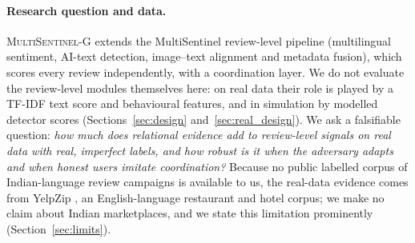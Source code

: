 \documentclass[pdflatex,sn-basic]{sn-jnl}
\theoremstyle{thmstyleone}
\theoremstyle{thmstylethree}
\newcommand{\MSG}{\textsc{MultiSentinel-G}}
\begin{document}
\paragraph{Research question and data.} \MSG{} extends the MultiSentinel review-level pipeline (multilingual sentiment, AI-text detection, image--text alignment and metadata fusion), which scores every review independently, with a coordination layer. We do not evaluate the review-level modules themselves here: on real data their role is played by a TF-IDF text score and behavioural features, and in simulation by modelled detector scores (Sections~\ref{sec:design} and~\ref{sec:real_design}). We ask a falsifiable question: \emph{how much does relational evidence add to review-level signals on real data with real, imperfect labels, and how robust is it when the adversary adapts and when honest users imitate coordination?} Because no public labelled corpus of Indian-language review campaigns is available to us, the real-data evidence comes from YelpZip \citep{rayana2015}, an English-language restaurant and hotel corpus; we make no claim about Indian marketplaces, and we state this limitation prominently (Section~\ref{sec:limits}).
\end{document}
